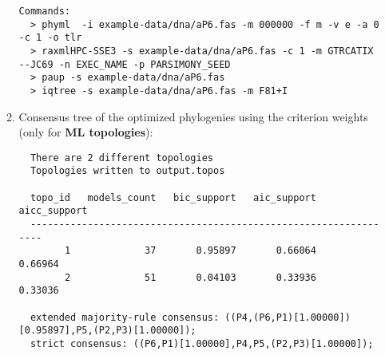 \begin{enumerate}
\begin{enumerate}
\begin{lstlisting}
Commands:
  > phyml  -i example-data/dna/aP6.fas -m 000000 -f m -v e -a 0 -c 1 -o tlr
  > raxmlHPC-SSE3 -s example-data/dna/aP6.fas -c 1 -m GTRCATIX --JC69 -n EXEC_NAME -p PARSIMONY_SEED
  > paup -s example-data/dna/aP6.fas
  > iqtree -s example-data/dna/aP6.fas -m F81+I
\end{lstlisting}

\item Consensus tree of the optimized phylogenies using the criterion weights (only for {\bf ML topologies}):

\begin{lstlisting}
  There are 2 different topologies
  Topologies written to output.topos

  topo_id   models_count   bic_support   aic_support   aicc_support
  -----------------------------------------------------------------
        1             37       0.95897       0.66064       0.66964
        2             51       0.04103       0.33936       0.33036

  extended majority-rule consensus: ((P4,(P6,P1)[1.00000])[0.95897],P5,(P2,P3)[1.00000]);
  strict consensus: ((P6,P1)[1.00000],P4,P5,(P2,P3)[1.00000]);
\end{lstlisting}

\end{enumerate}
\end{enumerate}
